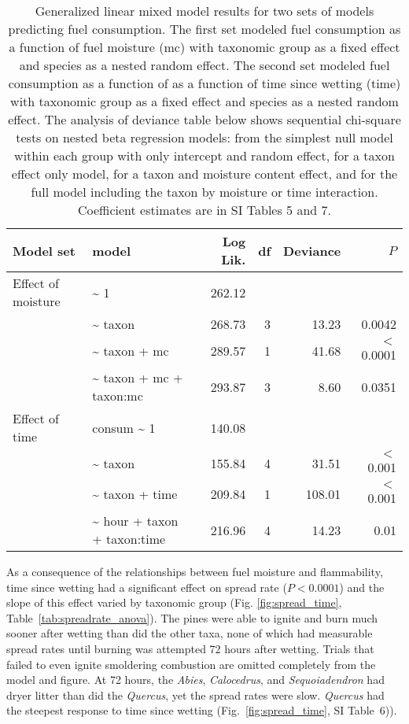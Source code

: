 \documentclass[letterpaper,12pt]{article}
\begin{document}
\begin{table}[h]
  \caption{Generalized linear mixed model results for two sets of models
    predicting fuel consumption. The first set modeled fuel consumption as a
    function of fuel moisture (mc) with taxonomic group as a fixed effect and
    species as a nested random effect. The second set modeled fuel consumption
    as a function of as a function of time since wetting (time) with taxonomic
    group as a fixed effect and species as a nested random effect. The analysis
    of deviance table below shows sequential chi-square tests on nested beta
    regression models: from the simplest null model within each group with only
    intercept and random effect, for a taxon effect only model, for a taxon and
    moisture content effect, and for the full model including the taxon by
    moisture or time interaction. Coefficient estimates are in SI Tables 5 and
    7.}
  \label{tab:consume_anova}
  \centering

  \begin{tabular}{llrrrr}
\toprule
Model set & model & Log Lik. & df & Deviance & $P$ \\ 
\midrule
  Effect of moisture &   \~{} 1 & 262.12 &  &  &  \\ 
   &  \~{} taxon & 268.73 & 3 & 13.23 & 0.0042 \\ 
   & \~{} taxon + mc & 289.57 & 1 & 41.68 & $<$ 0.0001 \\ 
   & \~{} taxon + mc + taxon:mc & 293.87 & 3 & 8.60 & 0.0351 \\ 
\midrule
Effect of time &  consum \~{} 1 & 140.08 &  &  &  \\ 
 & \~{} taxon & 155.84 & 4 & 31.51 & $<$ 0.001 \\ 
 & \~{} taxon + time & 209.84 & 1 & 108.01 & $<$ 0.001 \\ 
 & \~{} hour + taxon + taxon:time & 216.96 & 4 & 14.23 & 0.01 \\ 
    \bottomrule
    \end{tabular}
\end{table}


As a consequence of the relationships between fuel moisture and flammability,
time since wetting had a significant effect on spread rate ($P < 0.0001$) and
the slope of this effect varied by taxonomic group (Fig. \ref{fig:spread_time},
Table~\ref{tab:spreadrate_anova}). The pines were able to ignite and burn much
sooner after wetting than did the other taxa, none of which had measurable
spread rates until burning was attempted 72 hours after wetting. Trials that
failed to even ignite smoldering combustion are omitted completely from the
model and figure. At 72 hours, the \emph{Abies}, \emph{Calocedrus}, and
\emph{Sequoiadendron} had dryer litter than did the \emph{Quercus}, yet the
spread rates were slow. \emph{Quercus} had the steepest response to time since
wetting (Fig.~\ref{fig:spread_time}, SI Table~6)).
\end{document}
